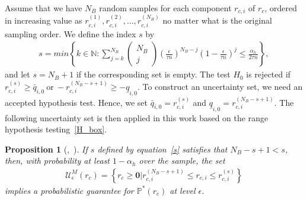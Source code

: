 \documentclass[10pt,twocolumn,twoside,english]{IEEEtran}
\newtheorem{proposition}{Proposition}
\begin{document}
Assume that we have $N_B$ random samples for each component $r_{c,i}$ of $r_c$, ordered in increasing value as $r^{(1)}_{c,i}, r^{(2)}_{c,i}, \dots, r^{(N_B)}_{c,i}$ no matter what is the original sampling order. We define the index $s$ by
\footnotesize
\begin{align}
s=min\left\{k \in \mathbb{N}: \sum\limits_{j=k}^{N_B}\left(\begin{array}{c}N_B\\j\end{array}\right) \left(\frac{\epsilon}{\tau n}\right)^{N_B-j} \left(1-\frac{\epsilon}{\tau n}\right)^j \leqslant \frac{\alpha_h}{2\tau n}\right\},
\label{s}
\end{align}
\normalsize
and let $s=N_B+1$ if the corresponding set is empty. 
The test $H_0$ is rejected if $r^{(s)}_{c,i}  \geqslant \bar{q}_{i,0}\  \text{or}\ - r_{c, i}^{(N_B-s+1)} \geqslant -\underline{q}_{i,0}$. To construct an uncertainty set, we need an accepted hypothesis test. Hence, we set $\bar{q}_{i,0}=r^{(s)}_{c,i}$ and $\underline{q}_{i,0}=r_{c, i}^{(N_B-s+1)}$. The following uncertainty set is then applied in this work based on the range hypothesis testing~\eqref{H_box}.
\begin{proposition}[\cite{datad_robust},~\cite{N_1970}]
If $s$ defined by equation~\eqref{s} satisfies that $N_B-s+1 < s$, then, with probability at least $1-\alpha_h$ over the sample, the set
\begin{align}
\mathcal{U}^M_{\epsilon} (r_c)=\left\{r_c \geqslant \mathbf{0}| r_{c,i}^{(N_B-s+1)}\leqslant r_{c,i} \leqslant r_{c,i}^{(s)}\right\}
\label{UM_box}
\end{align}
implies a probabilistic guarantee for $\mathbb{P}^*(r_c)$ at level $\epsilon$. 
\label{theorem_7}
\end{proposition}
\end{document}
